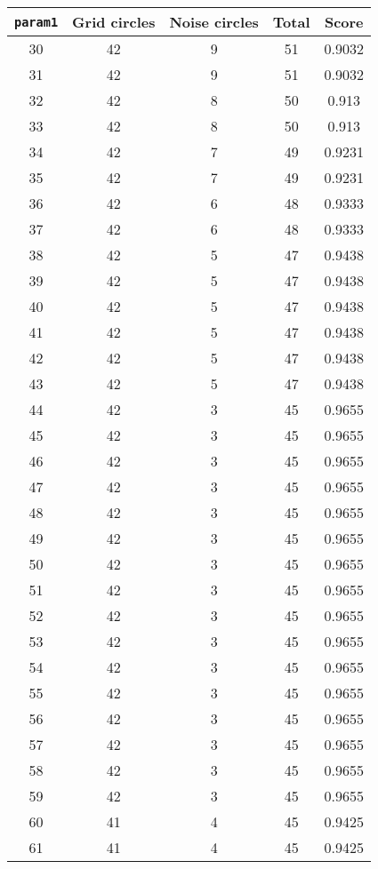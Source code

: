 \documentclass[letterpaper, 12pt]{article}
\begin{document}
\begin{longtable}{|c|c|c|c|c|}
\hline
\textbf{\texttt{param1}} & \textbf{Grid circles} & \textbf{Noise circles} & \textbf{Total} & \textbf{Score} \\
\hline
30 & 42 & 9 & 51 & 0.9032 \\
\hline
31 & 42 & 9 & 51 & 0.9032 \\
\hline
32 & 42 & 8 & 50 & 0.913 \\
\hline
33 & 42 & 8 & 50 & 0.913 \\
\hline
34 & 42 & 7 & 49 & 0.9231 \\
\hline
35 & 42 & 7 & 49 & 0.9231 \\
\hline
36 & 42 & 6 & 48 & 0.9333 \\
\hline
37 & 42 & 6 & 48 & 0.9333 \\
\hline
38 & 42 & 5 & 47 & 0.9438 \\
\hline
39 & 42 & 5 & 47 & 0.9438 \\
\hline
40 & 42 & 5 & 47 & 0.9438 \\
\hline
41 & 42 & 5 & 47 & 0.9438 \\
\hline
42 & 42 & 5 & 47 & 0.9438 \\
\hline
43 & 42 & 5 & 47 & 0.9438 \\
\hline
44 & 42 & 3 & 45 & 0.9655 \\
\hline
45 & 42 & 3 & 45 & 0.9655 \\
\hline
46 & 42 & 3 & 45 & 0.9655 \\
\hline
47 & 42 & 3 & 45 & 0.9655 \\
\hline
48 & 42 & 3 & 45 & 0.9655 \\
\hline
49 & 42 & 3 & 45 & 0.9655 \\
\hline
50 & 42 & 3 & 45 & 0.9655 \\
\hline
51 & 42 & 3 & 45 & 0.9655 \\
\hline
52 & 42 & 3 & 45 & 0.9655 \\
\hline
53 & 42 & 3 & 45 & 0.9655 \\
\hline
54 & 42 & 3 & 45 & 0.9655 \\
\hline
55 & 42 & 3 & 45 & 0.9655 \\
\hline
56 & 42 & 3 & 45 & 0.9655 \\
\hline
57 & 42 & 3 & 45 & 0.9655 \\
\hline
58 & 42 & 3 & 45 & 0.9655 \\
\hline
59 & 42 & 3 & 45 & 0.9655 \\
\hline
60 & 41 & 4 & 45 & 0.9425 \\
\hline
61 & 41 & 4 & 45 & 0.9425 \\

\end{longtable}
\end{document}
